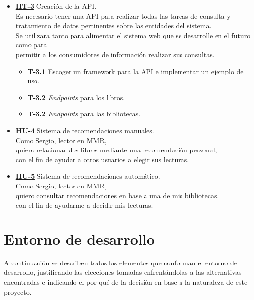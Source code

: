 \begin{itemize}
    \item \href{https://github.com/Anglepi/My-Many-Reads/issues/45}{\textbf{HT-3}} Creación de la API. \\
    Es necesario tener una API para realizar todas las tareas de consulta y tratamiento de datos pertinentes sobre las entidades del sistema. \\
    Se utilizara tanto para alimentar el sistema web que se desarrolle en el futuro como para \\
    permitir a los consumidores de información realizar sus consultas.
    \begin{itemize}
        \item \href{https://github.com/Anglepi/My-Many-Reads/issues/46}{\textbf{T-3.1}} Escoger un framework para la API e implementar un ejemplo de uso.
        \item \href{https://github.com/Anglepi/My-Many-Reads/issues/47}{\textbf{T-3.2}} \textit{Endpoints} para los libros.
        \item \href{https://github.com/Anglepi/My-Many-Reads/issues/48}{\textbf{T-3.2}} \textit{Endpoints} para las bibliotecas.
    \end{itemize}
    \item \href{https://github.com/Anglepi/My-Many-Reads/issues/49}{\textbf{HU-4}} Sistema de recomendaciones manuales. \\
    Como Sergio, lector en MMR, \\
    quiero relacionar dos libros mediante una recomendación personal, \\
    con el fin de ayudar a otros usuarios a elegir sus lecturas.
    \item \href{https://github.com/Anglepi/My-Many-Reads/issues/50}{\textbf{HU-5}} Sistema de recomendaciones automático. \\
    Como Sergio, lector en MMR, \\
    quiero consultar recomendaciones en base a una de mis bibliotecas, \\
    con el fin de ayudarme a decidir mis lecturas.
\end{itemize}

\section{Entorno de desarrollo}

A continuación se describen todos los elementos que conforman el entorno de desarrollo, justificando las elecciones tomadas enfrentándolas a las alternativas encontradas e indicando el por qué de la decisión en base a la naturaleza de este proyecto.

